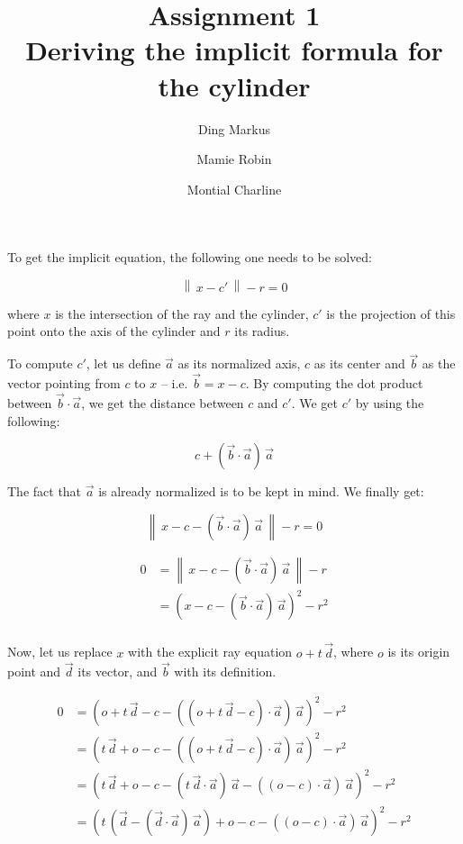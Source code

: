 \documentclass{article}
\title{{\Huge \textbf{Assignment 1}}\\
Deriving the implicit formula for the cylinder}
\author{Ding Markus \and Mamie Robin \and Montial Charline}
\newcommand{\norm}[1]{\left\lVert\,#1\,\right\rVert}
\begin{document}
    \maketitle
    
    To get the implicit equation, the following one needs to be solved:
    
    \[ \norm{x - c'} - r = 0 \]
    
    where $x$ is the intersection of the ray and the cylinder, $c'$ is the projection of this point onto the axis of the cylinder and $r$ its radius.
    
    To compute $c'$, let us define $\vec{a}$ as its normalized axis, $c$ as its center and $\vec{b}$ as the vector pointing from $c$ to $x$ -- i.e. $\vec{b} = x - c$.
    By computing the dot product between $\vec{b} \cdot \vec{a}$, we get the distance between $c$ and $c'$.
    We get $c'$ by using the following:
    
    \[ c + (\vec{b} \cdot \vec{a}) \, \vec{a} \]
    
    The fact that $\vec{a}$ is already normalized is to be kept in mind.
    We finally get:
    
    \[ \norm{x - c - (\vec{b} \cdot \vec{a}) \, \vec{a}} - r = 0 \]
    
    \begin{align*}
        0 &= \norm{x - c - (\vec{b} \cdot \vec{a}) \, \vec{a}} - r\\
        &= \left(x - c - (\vec{b} \cdot \vec{a}) \, \vec{a}\right)^2 - r^2\\
    \end{align*}
    
    Now, let us replace $x$ with the explicit ray equation $o + t \, \vec{d}$, where $o$ is its origin point and $\vec{d}$ its vector, and $\vec{b}$ with its definition.
    
    \begin{align*}
        0 &= \left(o + t \, \vec{d} - c - ((o + t \, \vec{d} - c) \cdot \vec{a}) \, \vec{a}\right)^2 - r^2\\
        &= \left(t \, \vec{d} + o - c - ((o + t \, \vec{d} - c) \cdot \vec{a}) \, \vec{a}\right)^2 - r^2\\
        &= \left(t \, \vec{d} + o - c - (t \, \vec{d} \cdot \vec{a}) \, \vec{a} - ((o - c) \cdot \vec{a}) \, \vec{a}\right)^2 - r^2\\
        &= \left(t \, (\vec{d} - (\vec{d} \cdot \vec{a}) \, \vec{a}) + o - c - ((o - c) \cdot \vec{a}) \, \vec{a}\right)^2 - r^2
    \end{align*}
    
\end{document}
